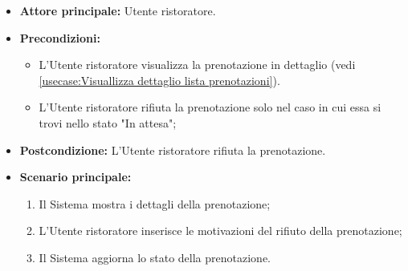 \label{usecase:Rifiuta prenotazione}
\begin{itemize}
	\item \textbf{Attore principale:} Utente ristoratore.

	\item \textbf{Precondizioni:} 
	\begin{itemize}
		\item L'Utente ristoratore visualizza la prenotazione in dettaglio (vedi \autoref{usecase:Visuallizza dettaglio lista prenotazioni}).
		\item L'Utente ristoratore rifiuta la prenotazione solo nel caso in cui essa si trovi nello stato "In attesa";
	\end{itemize}
	
	\item \textbf{Postcondizione:} L'Utente ristoratore rifiuta la prenotazione.



	\item \textbf{Scenario principale:}
	      \begin{enumerate}
		      \item Il Sistema mostra i dettagli della prenotazione;
		      \item L'Utente ristoratore inserisce le motivazioni del rifiuto della prenotazione;
		      \item Il Sistema aggiorna lo stato della prenotazione.

	      \end{enumerate}
\end{itemize}
